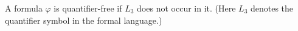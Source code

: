 A formula $\varphi$ is quantifier-free if $L_3$ does not occur in it. (Here $L_3$ denotes the quantifier symbol in the formal language.)

